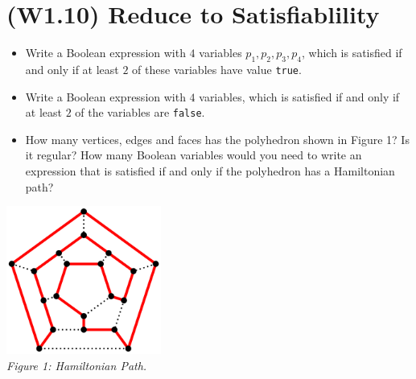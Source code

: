 \documentclass[jou]{apa6}
\begin{document}
\section{(W1.10) Reduce to Satisfiablility}

\begin{itemize}
\item Write a Boolean expression with $4$ variables $p_1,p_2,p_3,p_4$, 
which is satisfied if and only if at least $2$ of these variables
have value {\tt true}.
\item Write a Boolean expression with $4$ variables, which is 
satisfied if and only if at least $2$ of the variables are {\tt false}.
\item How many vertices, edges and faces has the polyhedron
shown in Figure 1? Is it regular? How many Boolean variables would 
you need to write an expression that is satisfied if and only if
the polyhedron has a Hamiltonian path?
\end{itemize}

\begin{center}
\includegraphics[width=2in]{hamiltonian-paths.png}\\
{\em Figure 1: Hamiltonian Path.}
\end{center}




\printbibliography
\end{document}
